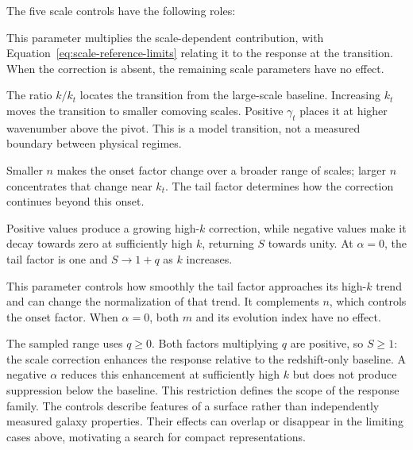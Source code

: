 The five scale controls have the following roles:
\begin{description}[style=unboxed,leftmargin=0pt,itemsep=0.5em,parsep=0pt]
  \item[Correction strength, $q$.]
  This parameter multiplies the scale-dependent contribution, with
  Equation~\eqref{eq:scale-reference-limits} relating it to the response at
  the transition. When the correction is absent, the remaining scale
  parameters have no effect.

  \item[Transition scale, $k_t(z)$.]
  The ratio $k/k_t$ locates the transition from the large-scale baseline.
  Increasing $k_t$ moves the transition to smaller comoving scales.
  Positive $\gamma_t$ places it at higher wavenumber above the pivot.
  This is a model transition, not a measured boundary between physical
  regimes.

  \item[Transition sharpness, $n(z)$.]
  Smaller $n$ makes the onset factor change over a broader range of
  scales; larger $n$ concentrates that change near $k_t$. The tail
  factor determines how the correction continues beyond this onset.

  \item[High-$k$ behaviour, $\alpha(z)$.]
  Positive values produce a growing high-$k$ correction, while negative
  values make it decay towards zero at sufficiently high $k$, returning
  $S$ towards unity. At $\alpha=0$, the tail factor is one and
  $S\longrightarrow1+q$ as $k$ increases.

  \item[Tail curvature, $m(z)$.]
  This parameter controls how smoothly the tail factor approaches its
  high-$k$ trend and can change the normalization of that trend.
  It complements $n$, which controls the onset factor. When
  $\alpha=0$, both $m$ and its evolution index have no effect.
\end{description}

The sampled range uses $q\geq0$. Both factors multiplying $q$ are
positive, so $S\geq1$: the scale correction enhances the response relative
to the redshift-only baseline. A negative $\alpha$ reduces this enhancement
at sufficiently high $k$ but does not produce suppression below the
baseline. This restriction defines the scope of the response family.
The controls describe features of a surface rather than independently
measured galaxy properties. Their effects can overlap or disappear in the
limiting cases above, motivating a search for compact representations.

